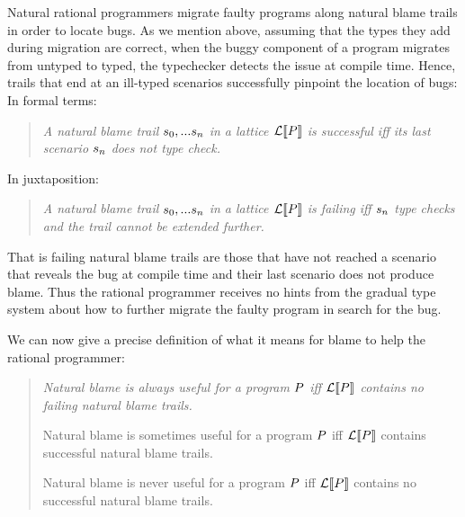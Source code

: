 Natural rational programmers migrate faulty programs along natural blame
trails in order to locate bugs. As we mention above, assuming that the types 
they add during migration are correct, when the buggy component of a
program migrates from untyped to typed, the typechecker detects the issue
at compile time. Hence, trails that end at an ill-typed scenarios successfully 
pinpoint the location of bugs:
In formal terms:
\begin{quote}
\it 
A natural blame trail $s_0,...s_n$ in a lattice $\mathcal{L}\llbracket P\rrbracket$ is
\emph{successful}  iff its last scenario $s_n$ does not type check.
  \end{quote}
  In juxtaposition:
\begin{quote}
\it 
A natural blame trail $s_0,...s_n$ in a lattice $\mathcal{L}\llbracket P\rrbracket$ is
\emph{failing}  iff $s_n$ type checks and the trail cannot be extended
  further. 
 \end{quote}
\noindent 
That is failing natural blame trails are those that have not reached a scenario that reveals
the bug at compile time and their last scenario does not produce
blame. Thus the rational programmer receives no hints from the gradual type
system about how to further migrate the faulty program in search for the
bug.

 We can now give a precise definition of what it
means for blame to help the rational programmer:
\begin{quote}
\it
  Natural blame is always useful for a program $P$ iff 
  $\mathcal{L}\llbracket P\rrbracket$ contains no failing natural blame trails.

   Natural blame is sometimes useful for a program $P$ iff 
  $\mathcal{L}\llbracket P\rrbracket$ contains successful natural blame trails.

   Natural blame is never useful for a program $P$ iff 
  $\mathcal{L}\llbracket P\rrbracket$ contains no successful natural blame trails.

\end{quote}

